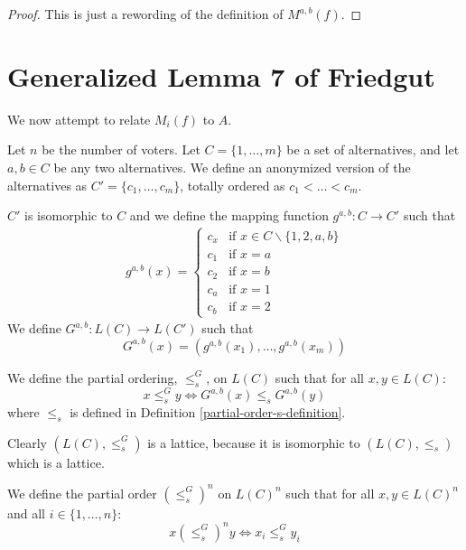 	\begin{proof}
		This is just a rewording of the definition of $M^{a,b}(f)$.
	\end{proof}


\section{Generalized Lemma 7 of Friedgut}

	We now attempt to relate $M_i(f)$ to $A$.

	Let $n$ be the number of voters. Let $C = \{1, \ldots, m\}$ be a set of alternatives, and let $a,b \in C$ be any two alternatives. We define an anonymized version of the alternatives as $C' = \{c_1, \ldots, c_m\}$, totally ordered as $c_1 < \ldots < c_m$.

	\begin{definition}
		$C'$ is isomorphic to $C$ and we define the mapping function $g^{a,b} : C \to C'$ such that
		\begin{align*}
			g^{a,b}(x) =
			\begin{cases}
				c_x & \textrm{if } x \in C \backslash \{1, 2, a, b\} \\
				c_1 & \textrm{if } x = a \\
				c_2 & \textrm{if } x = b \\
				c_a & \textrm{if } x = 1 \\
				c_b & \textrm{if } x = 2
			\end{cases}
		\end{align*}
		We define $G^{a,b} : L(C) \to L(C')$ such that
		\[
			G^{a,b}(x) = (g^{a,b}(x_1), \ldots, g^{a,b}(x_m))
		\]
	\end{definition}

	\begin{definition}
		We define the partial ordering, $\le^G_s$, on $L(C)$ such that for all $x, y \in L(C)$:
		\[
			x \le^G_s y \iff G^{a,b}(x) \le_s G^{a,b}(y)
		\]
		where $\le_s$ is defined in Definition \ref{partial-order-s-definition}.
	\end{definition}

	Clearly $(L(C), \le^G_s)$ is a lattice, because it is isomorphic to $(L(C), \le_s)$ which is a lattice.

	\begin{definition}
		We define the partial order $(\le^G_s)^n$ on $L(C)^n$ such that for all $x,y \in L(C)^n$ and all $i \in \{1, \ldots, n\}$:
		\[
			x (\le^G_s)^n y \iff x_i \le^G_s y_i
		\]
	\end{definition}

